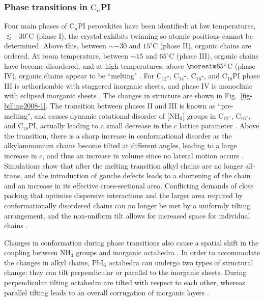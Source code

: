 \subsubsection{Phase transitions in $\textrm{C}_n$PI}
Four main phases of $\textrm{C}_n$PI perovskites have been identified: at low temperatures, $\lesssim -30^{\circ}$C (phase I), the crystal exhibits twinning so atomic positions cannot be determined. Above this, between $\sim-30$ and $15^{\circ}$C  (phase II), organic chains are ordered. At room temperature, between $\sim 15$ and $65^{\circ}$C (phase III), organic chains have become disordered, and at high temperatures, above $\moresim 65^{\circ}$C (phase IV), organic chains appear to be ``melting" \cite{Ishihara1990, Xu1991, Ishihara1989}. For $\textrm{C}_{12}$-, $\textrm{C}_{14}$-, $\textrm{C}_{16}$-, and $\textrm{C}_{18}$PI phase III is orthorhombic with staggered inorganic sheets, and phase IV is monoclinic with eclipsed inorganic sheets \cite{Billing2008}. The changes in structure are shown in Fig.\ \ref{fig-billing2008-1}. The transition between phases II and III is known as ``pre-melting", and causes dynamic rotational disorder of [$\textrm{NH}_3$] groups in $\textrm{C}_{12}$-, $\textrm{C}_{16}$-, and $\textrm{C}_{18}$PI, actually leading to a small decrease in the $c$ lattice parameter \cite{Barman2003}. Above the transition, there is a sharp increase in conformational disorder as the alkylammonium chains become tilted at different angles, leading to a large increase in $c$, and thus an increase in volume since no lateral motion occurs \cite{Barman2003}. Simulations show that after the melting transition alkyl chains are no longer all-trans, and the introduction of gauche defects leads to a shortening of the chain and an increase in its effective cross-sectional area. Conflicting demands of close packing that optimise dispersive interactions and the larger area required by conformationally disordered chains can no longer be met by a uniformly tilting arrangement, and the non-uniform tilt allows for increased space for individual chains \cite{Naik2010}. 

Changes in conformation during phase transitions also cause a spatial shift in the coupling between $\textrm{NH}_3$ groups and inorganic octahedra \cite{Pradeesh2009}. In order to accommodate the changes in alkyl chains, $\textrm{PbI}_6$ octahedra can undergo two types of structural change: they can tilt perpendicular or parallel to the inorganic sheets. During perpendicular tilting octahedra are tilted with respect to each other, whereas parallel tilting leads to an overall corrugation of inorganic layers \cite{Billing2008}. 

